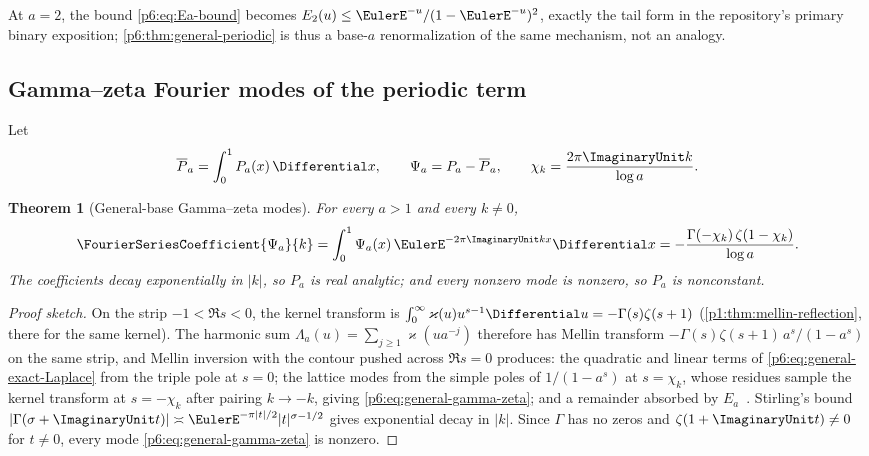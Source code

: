 \documentclass[11pt,oneside]{article}
\numberwithin{equation}{section}
\newtheorem{theorem}{Theorem}[section]
\theoremstyle{definition}
\theoremstyle{remark}
\begin{document}
At $a=2$, the bound \eqref{p6:eq:Ea-bound} becomes
$E_2(u)\le\EulerE^{-u}/(1-\EulerE^{-u})^2$, exactly the tail form in the repository's
primary binary exposition; \cref{p6:thm:general-periodic} is thus a base-$a$
renormalization of the same mechanism, not an analogy.

\subsection{Gamma--zeta Fourier modes of the periodic term}

Let
\begin{equation}\label{p6:eq:Psi-a}
 \overline P_a=\int_0^1P_a(x)\,\Differential x,
 \qquad
 \Psi_a=P_a-\overline P_a,
 \qquad
 \chi_k=\frac{2\pi\ImaginaryUnit k}{\log a}.
\end{equation}

\begin{theorem}[General-base Gamma--zeta modes]
\label{p6:thm:general-fourier-modes}
For every $a>1$ and every $k\ne0$,
\begin{equation}\label{p6:eq:general-gamma-zeta}
 \FourierSeriesCoefficient{\Psi_a}{k}=\int_0^1\Psi_a(x)\,\EulerE^{-2\pi\ImaginaryUnit kx}\Differential x
 =-\frac{\Gamma(-\chi_k)\,\zeta(1-\chi_k)}{\log a}.
\end{equation}
The coefficients decay exponentially in $|k|$, so $P_a$ is real analytic; and
every nonzero mode is nonzero, so $P_a$ is nonconstant.
\end{theorem}

\begin{proof}[Proof sketch]
On the strip $-1<\Re s<0$, the kernel transform is
$\int_0^\infty\varkappa(u)u^{s-1}\Differential u=-\Gamma(s)\zeta(s+1)$
(\cref{p1:thm:mellin-reflection}, there for the same kernel).  The harmonic sum
$\Lambda_a(u)=\sum_{j\ge1}\varkappa(ua^{-j})$ therefore has Mellin transform
$-\Gamma(s)\zeta(s+1)\,a^{s}/(1-a^{s})$ on the same strip, and Mellin inversion
with the contour pushed across $\Re s=0$ produces: the quadratic and linear
terms of \eqref{p6:eq:general-exact-Laplace} from the triple pole at $s=0$; the
lattice modes from the simple poles of $1/(1-a^s)$ at $s=\chi_k$, whose
residues sample the kernel transform at $s=-\chi_k$ after pairing $k\to-k$,
giving \eqref{p6:eq:general-gamma-zeta}; and a remainder absorbed by
$E_a$~\cite{p6:flajolet-gd}.  Stirling's bound
$|\Gamma(\sigma+\ImaginaryUnit t)|\asymp\EulerE^{-\pi|t|/2}|t|^{\sigma-1/2}$ gives exponential
decay in $|k|$.  Since $\Gamma$ has no zeros and $\zeta(1+\ImaginaryUnit t)\ne0$ for
$t\ne0$, every mode \eqref{p6:eq:general-gamma-zeta} is nonzero.
\end{proof}
\end{document}
